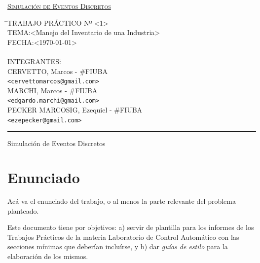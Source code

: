 \documentclass[10pt]{article}
\begin{document}
\begin{titlepage}
\vfill

\begin{center} %
\Large{\underline{\textsc{Simulación de Eventos Discretos}}}
\end{center}

\vfill

\begin{tabbing}
\hspace{2cm}\=\+TRABAJO PRÁCTICO Nº \textless{}1\textgreater{}\\
	TEMA:\textless{}Manejo del Inventario de una Industria\textgreater{}\\
	FECHA:\textless{\today}\textgreater{}\\
\\
	INTEGRANTES:\hspace{-1cm}\=\+\hspace{1cm}\=\hspace{6cm}\=\\
		CERVETTO, Marcos	\>\>- \#FIUBA\\
			\>\footnotesize{\verb!<cervettomarcos@gmail.com>!}\\
		MARCHI, Marcos	\>\>- \#FIUBA\\
			\>\footnotesize{\verb!<edgardo.marchi@gmail.com>!}\\
		PECKER MARCOSIG, Ezequiel	\>\>- \#FIUBA\\
			\>\footnotesize{\verb!<ezepecker@gmail.com>!}\\
\end{tabbing}

\vfill

\hrule
\vspace{0.2cm}

\noindent\small{Simulación de Eventos Discretos}

\end{titlepage}

%
%
\setcounter{page}{1}

%
%
\tableofcontents
\newpage

%
%

\section{Enunciado}
Acá va el enunciado del trabajo, o al menos la parte relevante del problema
planteado.

Este documento tiene por objetivos: a) servir de plantilla para los informes 
de los Trabajos Prácticos de la materia Laboratorio de Control Automático 
con las secciones mínimas que deberían incluírse, y b) dar \textit{guías de estilo} 
para la elaboración de los mismos.
\end{document}
